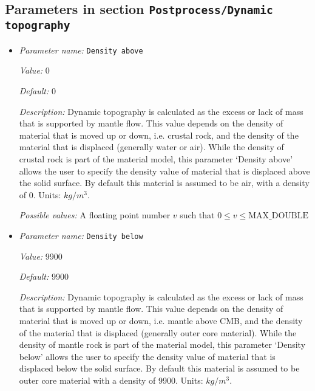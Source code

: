 \subsection{Parameters in section \tt Postprocess/Dynamic topography}
\label{parameters:Postprocess/Dynamic_20topography}

\begin{itemize}
\item {\it Parameter name:} {\tt Density above}
\label{parameters:Postprocess/Dynamic topography/Density above}
\label{parameters:Postprocess/Dynamic_20topography/Density_20above}


{\it Value:} 0


{\it Default:} 0


{\it Description:} Dynamic topography is calculated as the excess or lack of mass that is supported by mantle flow. This value depends on the density of material that is moved up or down, i.e. crustal rock, and the density of the material that is displaced (generally water or air). While the density of crustal rock is part of the material model, this parameter `Density above' allows the user to specify the density value of material that is displaced above the solid surface. By default this material is assumed to be air, with a density of 0. Units: $kg/m^3$.


{\it Possible values:} A floating point number $v$ such that $0 \leq v \leq \text{MAX\_DOUBLE}$
\item {\it Parameter name:} {\tt Density below}
\label{parameters:Postprocess/Dynamic topography/Density below}
\label{parameters:Postprocess/Dynamic_20topography/Density_20below}


{\it Value:} 9900


{\it Default:} 9900


{\it Description:} Dynamic topography is calculated as the excess or lack of mass that is supported by mantle flow. This value depends on the density of material that is moved up or down, i.e. mantle above CMB, and the density of the material that is displaced (generally outer core material). While the density of mantle rock is part of the material model, this parameter `Density below' allows the user to specify the density value of material that is displaced below the solid surface. By default this material is assumed to be outer core material with a density of 9900. Units: $kg/m^3$.



\end{itemize}
